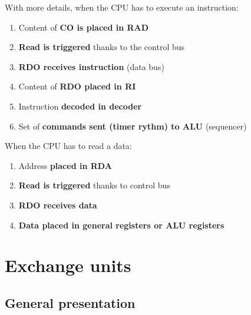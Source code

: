 \documentclass{beamer}[10pt, usepdftitle=false, handout]
\begin{document}
	\begin{frame}
	
	With more details, when the CPU has to execute an instruction:	
	
	\vspace*{0.5em}
	
	\begin{enumerate}
	\item{Content of \textbf{CO is placed in RAD}}
	\item{\textbf{Read is triggered} thanks to the control bus}
	\item{\textbf{RDO receives instruction} (data bus)}
	\item{Content of \textbf{RDO placed in RI}}
	\item{Instruction \textbf{decoded in decoder}}
	\item{Set of \textbf{commands sent (timer rythm) to ALU} (sequencer)}
	
	\end{enumerate}
	
	\vspace*{0.5em}	
	
	When the CPU has to read a data:
	
	\vspace*{0.5em}	
		
	\begin{enumerate}
	\item{Address \textbf{placed in RDA}}
	\item{\textbf{Read is triggered} thanks to control bus}
	\item{\textbf{RDO receives data}}
	\item{\textbf{Data placed in general registers or ALU registers}}
	\end{enumerate}			
		
	
	\end{frame}	
	
	\section{Exchange units}
	\subsection{General presentation}	
	
\end{document}
